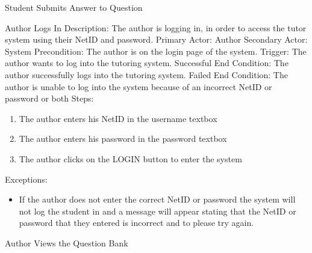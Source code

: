 \begin{section}{Student Submits Answer to Question}
    \begin{section}{Author Logs In}
        Description: The author is logging in, in order to access the tutor system using their NetID and password. \newline
        Primary Actor: Author \newline
        Secondary Actor: System \newline
        Precondition: The author is on the login page of the system. \newline
        Trigger: The author wants to log into the tutoring system. \newline
        Successful End Condition: The author successfully logs into the tutoring system. \newline
        Failed End Condition:  The author is unable to log into the system because of an incorrect NetID or password or both \newline
        \newline
        Steps:
        \begin{enumerate}
            \item{The author enters his NetID in the username textbox}
            \item{The author enters his password in the password textbox}
            \item{The author clicks on the LOGIN button to enter the system}
        \end{enumerate}
        Exceptions:
        \begin{itemize}
            \item{If the author does not enter the correct NetID or password 
            the system will not log the student in and a message will appear stating 
            that the NetID or password that they entered is incorrect and to please try again.}
        \end{itemize}
    \end{section}
  
  
    
    \begin{section}{Author Views the Question Bank}
    
    \end{section}
    
    
    

\end{section}
